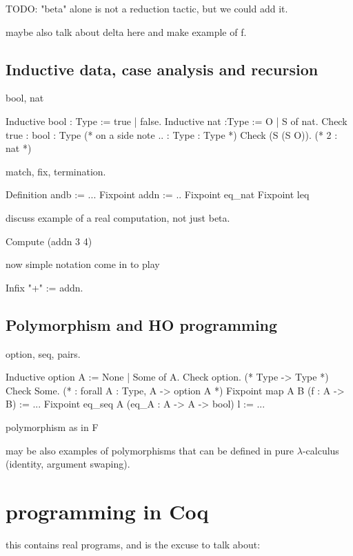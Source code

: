 TODO: "beta" alone is not a reduction tactic, but we could add it.

maybe also talk about delta here and make example of f.

\subsection{Inductive data, case analysis and recursion}
bool, nat

\begin{coq}{}
Inductive bool : Type := true | false.
Inductive nat :Type := O | S of nat.
Check true : bool : Type (* on a side note .. : Type : Type *)
Check (S (S O)). (* 2 : nat *)
\end{coq}

match, fix, termination.

\begin{coq}{}
Definition andb := ...
Fixpoint addn := ..
Fixpoint eq_nat
Fixpoint leq
\end{coq}

discuss example of a real computation, not just beta.

\begin{coq}{}
Compute (addn 3 4)
\end{coq}

now simple notation come in to play

\begin{coq}{}
Infix "+" := addn.
\end{coq}

\subsection{Polymorphism and HO programming}
option, seq, pairs.

\begin{coq}{}
Inductive option A := None | Some of A.
Check option. (* Type -> Type *)
Check Some. (* : forall A : Type, A -> option A *)
Fixpoint map A B (f : A -> B) := ...
Fixpoint eq_seq A (eq_A : A -> A -> bool) l := ...
\end{coq}

polymorphism as in F

may be also examples of polymorphisms that can be defined in pure
$\lambda$-calculus (identity, argument swaping).

\section{programming in Coq}
this contains real programs, and is the excuse to talk about:

